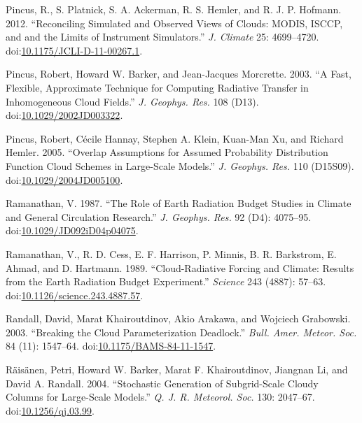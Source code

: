 \hypertarget{ref-pincusux5fetux5falux5f2012}{}
Pincus, R., S. Platnick, S. A. Ackerman, R. S. Hemler, and R. J. P.
Hofmann. 2012. ``Reconciling Simulated and Observed Views of Clouds:
MODIS, ISCCP, and and the Limits of Instrument Simulators.'' \emph{J.
Climate} 25: 4699--4720.
doi:\href{https://doi.org/10.1175/JCLI-D-11-00267.1}{10.1175/JCLI-D-11-00267.1}.

\hypertarget{ref-pincusux5fetux5falux5f2003}{}
Pincus, Robert, Howard W. Barker, and Jean-Jacques Morcrette. 2003. ``A
Fast, Flexible, Approximate Technique for Computing Radiative Transfer
in Inhomogeneous Cloud Fields.'' \emph{J. Geophys. Res.} 108 (D13).
doi:\href{https://doi.org/10.1029/2002JD003322}{10.1029/2002JD003322}.

\hypertarget{ref-pincusux5fetux5falux5f2005}{}
Pincus, Robert, Cécile Hannay, Stephen A. Klein, Kuan-Man Xu, and
Richard Hemler. 2005. ``Overlap Assumptions for Assumed Probability
Distribution Function Cloud Schemes in Large-Scale Models.'' \emph{J.
Geophys. Res.} 110 (D15S09).
doi:\href{https://doi.org/10.1029/2004JD005100}{10.1029/2004JD005100}.

\hypertarget{ref-ramanathanux5f1987}{}
Ramanathan, V. 1987. ``The Role of Earth Radiation Budget Studies in
Climate and General Circulation Research.'' \emph{J. Geophys. Res.} 92
(D4): 4075--95.
doi:\href{https://doi.org/10.1029/JD092iD04p04075}{10.1029/JD092iD04p04075}.

\hypertarget{ref-ramanathanux5fetux5falux5f1989}{}
Ramanathan, V., R. D. Cess, E. F. Harrison, P. Minnis, B. R. Barkstrom,
E. Ahmad, and D. Hartmann. 1989. ``Cloud-Radiative Forcing and Climate:
Results from the Earth Radiation Budget Experiment.'' \emph{Science} 243
(4887): 57--63.
doi:\href{https://doi.org/10.1126/science.243.4887.57}{10.1126/science.243.4887.57}.

\hypertarget{ref-randallux5fetux5falux5f2003}{}
Randall, David, Marat Khairoutdinov, Akio Arakawa, and Wojciech
Grabowski. 2003. ``Breaking the Cloud Parameterization Deadlock.''
\emph{Bull. Amer. Meteor. Soc.} 84 (11): 1547--64.
doi:\href{https://doi.org/10.1175/BAMS-84-11-1547}{10.1175/BAMS-84-11-1547}.

\hypertarget{ref-raisanenux5fetux5falux5f2004}{}
Räisänen, Petri, Howard W. Barker, Marat F. Khairoutdinov, Jiangnan Li,
and David A. Randall. 2004. ``Stochastic Generation of Subgrid-Scale
Cloudy Columns for Large-Scale Models.'' \emph{Q. J. R. Meteorol. Soc.}
130: 2047--67.
doi:\href{https://doi.org/10.1256/qj.03.99}{10.1256/qj.03.99}.

